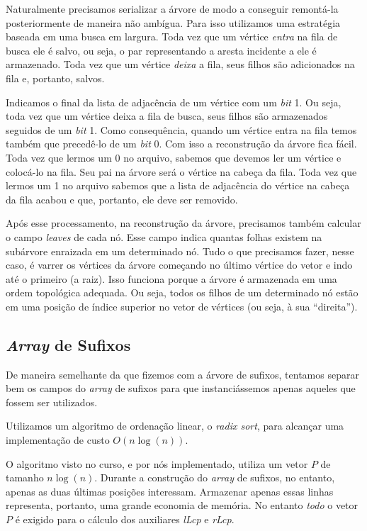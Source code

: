 \documentclass[]{article}
\begin{document}
Naturalmente precisamos serializar a árvore de modo a conseguir remontá-la posteriormente de maneira não ambígua. Para isso utilizamos uma estratégia baseada em uma busca em largura. Toda vez que um vértice \textit{entra} na fila de busca ele é salvo, ou seja, o par representando a aresta incidente a ele é armazenado. Toda vez que um vértice \textit{deixa} a fila, seus filhos são adicionados na fila e, portanto, salvos. 

Indicamos o final da lista de adjacência de um vértice com um \textit{bit} 1. Ou seja, toda vez que um vértice deixa a fila de busca, seus filhos são armazenados seguidos de um \textit{bit} 1. Como consequência, quando um vértice entra na fila temos também que precedê-lo de um \textit{bit} 0. Com isso a reconstrução da árvore fica fácil. Toda vez que lermos um 0 no arquivo, sabemos que devemos ler um vértice e colocá-lo na fila. Seu pai na árvore será o vértice na cabeça da fila. Toda vez que lermos um 1 no arquivo sabemos que a lista de adjacência do vértice na cabeça da fila acabou e que, portanto, ele deve ser removido. 

Após esse processamento, na reconstrução da árvore, precisamos também calcular o campo \textit{leaves} de cada nó. Esse campo indica quantas folhas existem na subárvore enraizada em um determinado nó. Tudo o que precisamos fazer, nesse caso, é varrer os vértices da árvore começando no último vértice do vetor e indo até o primeiro (a raiz). Isso funciona porque a árvore é armazenada em uma ordem topológica adequada. Ou seja, todos os filhos de um determinado nó estão em uma posição de índice superior no vetor de vértices (ou seja, à sua ``direita'').

\subsection{\textit{Array} de Sufixos}

De maneira semelhante da que fizemos com a árvore de sufixos, tentamos separar bem os campos do \textit{array} de sufixos para que instanciássemos apenas aqueles que fossem ser utilizados.

Utilizamos um algoritmo de ordenação linear, o \textit{radix sort}, para alcançar uma implementação de custo $O(n\log(n))$.

O algoritmo visto no curso, e por nós implementado, utiliza um vetor $P$ de tamanho $n\log(n)$. Durante a construção do \textit{array} de sufixos, no entanto, apenas as duas últimas posições interessam. Armazenar apenas essas linhas representa, portanto, uma grande economia de memória. No entanto \textit{todo} o vetor $P$ é exigido para o cálculo dos auxiliares \textit{lLcp} e \textit{rLcp}.
\end{document}
